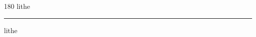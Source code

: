 
\begin{frame}
\begin{center}
\begin{turn}{180}
{\fontsize{2.5cm}{1em}\selectfont lithe}
\end{turn}
\vspace{1em}\par  
\hrule
\vspace{1em}\par  
{\fontsize{2.5cm}{1em}\selectfont lithe}
\end{center}
\end{frame}

